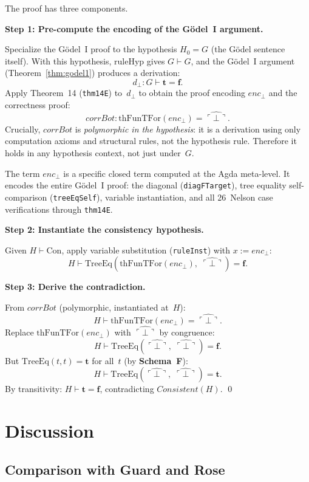 \documentclass[11pt]{article}
\newcommand{\trueT}{\mathbf{t}}
\newcommand{\falseT}{\mathbf{f}}
\newcommand{\SchemaF}{\textbf{Schema~F}}
\newcommand{\code}[1]{\ulcorner #1 \urcorner}
\newcommand{\reify}[1]{\widehat{#1}}
\newcommand{\thFunTFor}{\mathrm{thFunTFor}}
\newcommand{\TreeEq}{\mathrm{TreeEq}}
\begin{document}
The proof has three components.

\medskip\noindent
\textbf{Step 1: Pre-compute the encoding of the G\"odel~I argument.}

\noindent
Specialize the G\"odel~I proof to the hypothesis
$H_0 = G$ (the G\"odel sentence itself).
With this hypothesis, $\mathrm{ruleHyp}$ gives
$G \vdash G$, and the G\"odel~I argument
(Theorem~\ref{thm:godel1}) produces a derivation:
\[
  d_\bot : G \vdash \trueT = \falseT.
\]
Apply Theorem~14 (\texttt{thm14E}) to~$d_\bot$ to obtain
the proof encoding $\mathit{enc}_\bot$ and the correctness proof:
\[
  \mathit{corrBot} : \thFunTFor(\mathit{enc}_\bot) = \reify{\code{\bot}}.
\]
Crucially, $\mathit{corrBot}$ is \emph{polymorphic in the hypothesis}:
it is a derivation using only computation axioms and structural
rules, not the hypothesis rule.  Therefore it holds in any
hypothesis context, not just under~$G$.

The term $\mathit{enc}_\bot$ is a specific closed term computed
at the Agda meta-level.  It encodes the entire G\"odel~I
proof: the diagonal (\texttt{diagFTarget}), tree equality
self-comparison (\texttt{treeEqSelf}), variable instantiation,
and all 26~Nelson case verifications through \texttt{thm14E}.

\medskip\noindent
\textbf{Step 2: Instantiate the consistency hypothesis.}

\noindent
Given $H \vdash \mathrm{Con}$, apply variable
substitution (\texttt{ruleInst}) with $x := \mathit{enc}_\bot$:
\[
  H \vdash \TreeEq(\thFunTFor(\mathit{enc}_\bot),\;\reify{\code{\bot}}) = \falseT.
\]

\medskip\noindent
\textbf{Step 3: Derive the contradiction.}

\noindent
From $\mathit{corrBot}$ (polymorphic, instantiated at~$H$):
\[
  H \vdash \thFunTFor(\mathit{enc}_\bot) = \reify{\code{\bot}}.
\]
Replace $\thFunTFor(\mathit{enc}_\bot)$ with $\reify{\code{\bot}}$
by congruence:
\[
  H \vdash \TreeEq(\reify{\code{\bot}},\;\reify{\code{\bot}}) = \falseT.
\]
But $\TreeEq(t, t) = \trueT$ for all~$t$ (by \SchemaF{}):
\[
  H \vdash \TreeEq(\reify{\code{\bot}},\;\reify{\code{\bot}}) = \trueT.
\]
By transitivity: $H \vdash \trueT = \falseT$,
contradicting $\mathit{Consistent}(H)$.
\qed

\section{Discussion}

\subsection*{Comparison with Guard and Rose}
\end{document}
